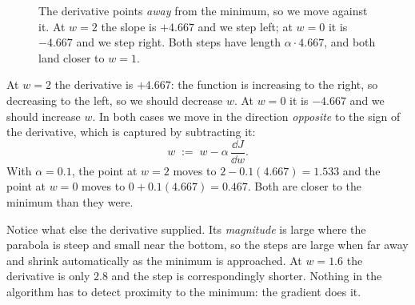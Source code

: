 \begin{figure}[htbp]
  \centering
  \caption{The derivative points \emph{away} from the minimum, so we move
  against it. At $w=2$ the slope is $+4.667$ and we step left; at $w=0$ it is
  $-4.667$ and we step right. Both steps have length $\alpha\cdot 4.667$, and
  both land closer to $w=1$.}
  \label{fig:tangents}
\end{figure}

At $w = 2$ the derivative is $+4.667$: the function is increasing to the right,
so decreasing to the left, so we should decrease $w$. At $w = 0$ it is $-4.667$
and we should increase $w$. In both cases we move in the direction
\emph{opposite} to the sign of the derivative, which is captured by subtracting
it:
\[
  w \;:=\; w - \alpha\,\frac{\dd J}{\dd w}.
\]
With $\alpha = 0.1$, the point at $w = 2$ moves to $2 - 0.1(4.667) = 1.533$ and
the point at $w = 0$ moves to $0 + 0.1(4.667) = 0.467$. Both are closer to the
minimum than they were.

Notice what else the derivative supplied. Its \emph{magnitude} is large where
the parabola is steep and small near the bottom, so the steps are large when far
away and shrink automatically as the minimum is approached. At $w = 1.6$ the
derivative is only $2.8$ and the step is correspondingly shorter. Nothing in the
algorithm has to detect proximity to the minimum: the gradient does it.

